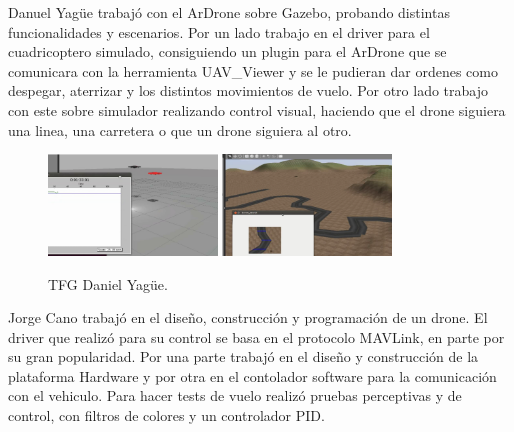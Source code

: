 \hspace{1 cm} Danuel Yag\"ue \cite{MediaWikiDanielYagueSanchez} trabaj\'o con el ArDrone sobre Gazebo, probando distintas funcionalidades y escenarios. Por un lado trabajo en el driver para el cuadricoptero simulado, consiguiendo un plugin para el ArDrone que se comunicara con la herramienta UAV\_Viewer y se le pudieran dar ordenes como despegar, aterrizar y los distintos movimientos de vuelo. Por otro lado trabajo con este sobre simulador realizando control visual, haciendo que el drone siguiera una linea, una carretera o que un drone siguiera al otro.
\begin{figure}[H]
 \centering
    \includegraphics[width=0.4\textwidth]{imgs/DaniYague1_1.png}
    \includegraphics[width=0.4\textwidth]{imgs/DaniYague2_1.png}
 \caption{TFG Daniel Yag\"ue.}
 \label{f:DanielYague}
\end{figure} 


\hspace{1 cm} Jorge Cano \cite{MediaWikiJorgeCanoMartinez} trabaj\'o en el diseño, construcci\'on y programaci\'on de un drone. El driver que realiz\'o para su control se basa en el protocolo MAVLink, en parte por su gran popularidad. Por una parte trabaj\'o en el diseño y construcci\'on de la plataforma Hardware y por otra en el contolador software para la comunicaci\'on con el vehiculo. Para hacer tests de vuelo realiz\'o pruebas perceptivas y de control, con filtros de colores y un controlador PID.

